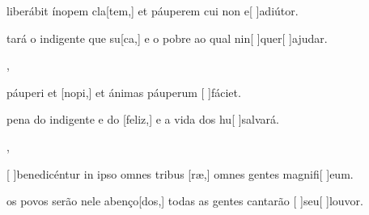 {  {\item {} liberábit ínopem cla[tem,] et páuperem cui non e[ ]{ad}{iú}tor.~\Antiphona}%
    {\item {}tará o indigente que su[ca,] e o pobre ao qual nin[ ]{quer}[ ]{a}judar.~\Antiphona},
  {\item {} páuperi et [nopi,] et ánimas páuperum [ ]{fá}ciet.~\Antiphona}%
    {\item {} pena do indigente e do [feliz,] e a vida dos hu[ ]{sal}vará.~\Antiphona},
  {\item {}[ ]{be}nedicéntur in ipso omnes tribus [ræ,] omnes gentes magnifi[ ]{e}um.~\Antiphona}%
    {\item {} os povos serão nele abenço[dos,] todas as gentes cantarão [ ]{seu}[ ]{lou}vor.~\Antiphona}
}